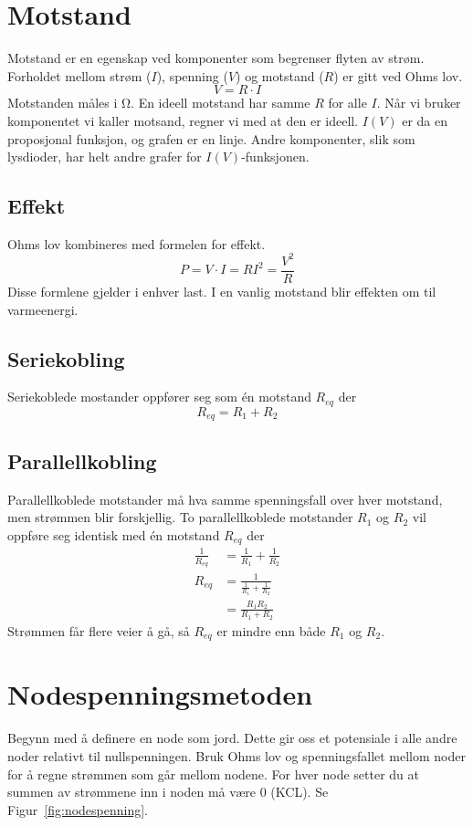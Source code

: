 \documentclass[12pt,a4paper,norsk]{article}
\newcommand{\resi}[1]{\frac{1}{#1}}
\begin{document}
\section{Motstand}
Motstand er en egenskap ved komponenter som begrenser flyten av strøm. Forholdet
mellom strøm ($I$), spenning ($V$) og motstand ($R$) er gitt ved Ohms lov.
\[V = R \cdot I\]
Motstanden måles i \si{\ohm}. En ideell motstand har samme $R$ for alle $I$. Når
vi bruker komponentet vi kaller motsand, regner vi med at den er ideell. $I(V)$
er da en proposjonal funksjon, og grafen er en linje. Andre komponenter, slik
som lysdioder, har helt andre grafer for $I(V)$-funksjonen.

\subsection{Effekt}
Ohms lov kombineres med formelen for effekt.
\[P = V \cdot I = RI^{2} = \frac{V^{2}}{R}\]
Disse formlene gjelder i enhver last. I en vanlig motstand blir effekten om til
varmeenergi.

\subsection{Seriekobling}
Seriekoblede mostander oppfører seg som én motstand $R_{eq}$ der
\[R_{eq} = R_{1} + R_{2}\]

\subsection{Parallellkobling}
Parallellkoblede motstander må hva samme spenningsfall over hver motstand, men
strømmen blir forskjellig. To parallellkoblede motstander $R_{1}$ og $R_{2}$ vil
oppføre seg identisk med én motstand $R_{eq}$ der
\begin{align*}
  \resi{R_{eq}} &= \resi{R_{1}} + \resi{R_{2}} \\
  R_{eq} &= \resi{\resi{R_{1}} + \resi{R_{2}}} \\
        &= \frac{R_{1}R_{2}}{R_{1} + R_{2}}
\end{align*}
Strømmen får flere veier å gå, så $R_{eq}$ er mindre enn både $R_{1}$ og $R_{2}$.

\section{Nodespenningsmetoden}
Begynn med å definere en node som jord. Dette gir oss et potensiale i alle andre
noder relativt til nullspenningen. Bruk Ohms lov og spenningsfallet mellom noder
for å regne strømmen som går mellom nodene. For hver node setter du at summen av
strømmene inn i noden må være 0 (KCL). Se Figur~\ref{fig:nodespenning}.
\end{document}

